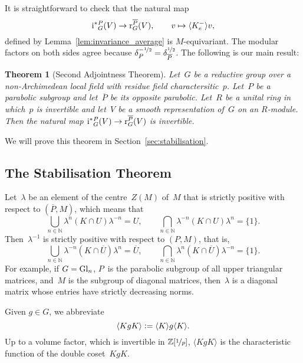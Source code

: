 \documentclass{amsart}
\newtheorem{theorem}{Theorem}[section]
\theoremstyle{remark}
\theoremstyle{definition}
\newcommand*{\Jact}{\textup i^*{}}%
\newcommand*{\Jacr}{\textup r}%
\newcommand*{\nb}{\nobreakdash}%
\newcommand*{\defeq}{\mathrel{\vcentcolon=}}%
\newcommand*{\idem}[1]{\langle#1\rangle}%
\newcommand*{\opp}[1]{\overline{#1}}%
\newcommand*{\N}{\mathbb N}%
\newcommand*{\Z}{\mathbb Z}%
\newcommand*{\Gl}{\textup{Gl}}%
\newcommand{\ring}{R}%
\begin{document}
It is straightforward to check that the natural map
\[
\Jact_G^P(V)\to \Jacr_G^{\opp{P}}(V),\qquad
v\mapsto \idem{K_e^-}v,
\]
defined by Lemma~\ref{lem:invariance_average} is \(M\)\nb-equivariant.  The modular factors on both sides agree because \(\delta_P^{-\nicefrac12} = \delta_{\opp{P}}^{\nicefrac12}\).  The following is our main result:

\begin{theorem}[Second Adjointness Theorem]
  \label{the:second_adjointness}
  Let~\(G\) be a reductive group over a non-Archimedean local field with residue field charactersitic~\(p\).  Let~\(P\) be a parabolic subgroup and let~\(\opp{P}\) be its opposite parabolic.  Let~\(\ring\) be a unital ring in which~\(p\) is invertible and let~\(V\) be a smooth representation of~\(G\) on an \(\ring\)\nb-module.  Then the natural map \(\Jact_G^P(V)\to \Jacr_G^{\opp{P}}(V)\) is invertible.
\end{theorem}

We will prove this theorem in Section~\ref{sec:stabilisation}.


\subsection{The Stabilisation Theorem}
\label{sec:stabilisation_formulation}

Let~\(\lambda\) be an element of the centre~\(Z(M)\) of~\(M\) that is strictly positive with respect to \((\opp{P},M)\), which means that
\begin{equation}
  \label{eq:lambdaK+}
  \bigcup_{n\in\N} \lambda^n (K \cap U) \lambda^{-n} = U,\qquad
  \bigcap_{n\in\N} \lambda^{-n} (K \cap U) \lambda^n = \{1\}.
\end{equation}
Then~\(\lambda^{-1}\) is strictly positive with respect to \((P,M)\), that is,
\begin{equation}
  \label{eq:lambdaK-}
  \bigcup_{n\in\N} \lambda^{-n} (K \cap \opp{U}) \lambda^n = \opp{U},\qquad
  \bigcap_{n\in\N} \lambda^n (K \cap \opp{U}) \lambda^{-n} = \{1\}.
\end{equation}
For example, if \(G=\Gl_n\), \(P\)~is the parabolic subgroup of all upper triangular matrices, and~\(M\) is the subgroup of diagonal matrices, then~\(\lambda\) is a diagonal matrix whose entries have strictly decreasing norms.

Given \(g\in G\), we abbreviate
\[
\idem{K g K} \defeq \idem{K} g \idem{K}.
\]
Up to a volume factor, which is invertible in \(\Z[\nicefrac1p]\), \(\idem{K g K}\) is the characteristic function of the double coset~\(KgK\).
\end{document}
